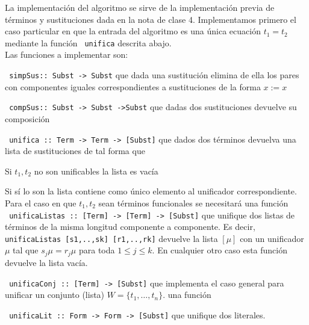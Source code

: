 \documentclass[11pt,letterpaper]{article}
\begin{document}
La implementación del algoritmo se sirve de la implementación previa de 
términos y sustituciones dada en la nota de clase 4. 
Implementamos primero el caso particular en que la entrada del algoritmo es una 
única ecuación $t_1=t_2$ mediante la función \verb! unifica! descrita abajo.\\
Las funciones a implementar son:
\bi
\item \verb! simpSus:: Subst -> Subst! que dada una sustitución elimina de ella 
los pares con componentes iguales correspondientes a sustituciones de la forma 
$x:=x$
\item \verb! compSus:: Subst -> Subst ->Subst! que dadas dos sustituciones 
devuelve su composición
\item \verb! unifica :: Term -> Term -> [Subst]! que dados dos términos 
devuelva 
una lista de sustituciones de tal forma que
\bi
\item Si $t_1,t_2$ no son unificables la lista es vacía
\item Si sí lo son la lista contiene como único elemento al unificador 
correspondiente.
\ei
Para el caso en que $t_1,t_2 $  sean términos funcionales se necesitará una 
función \\
\verb! unificaListas :: [Term] -> [Term] -> [Subst]!
que unifique dos listas de términos de la misma longitud componente a 
componente. Es decir, 
\verb!unificaListas [s1,..,sk] [r1,..,rk]! devuelve la lista $[\mu]$ con un 
unificador $\mu$ tal que $s_j\mu=r_j\mu$ para toda $1\leq j\leq k$. En 
cualquier otro caso esta función devuelve la lista vacía. 
\item \verb! unificaConj :: [Term] -> [Subst]! que implementa el caso general 
para unificar un conjunto (lista) $W=\{t_1,\ldots,t_n\}$.%
una función 
\item \verb! unificaLit :: Form -> Form -> [Subst]! que unifique dos literales.

\ei
\end{document}
